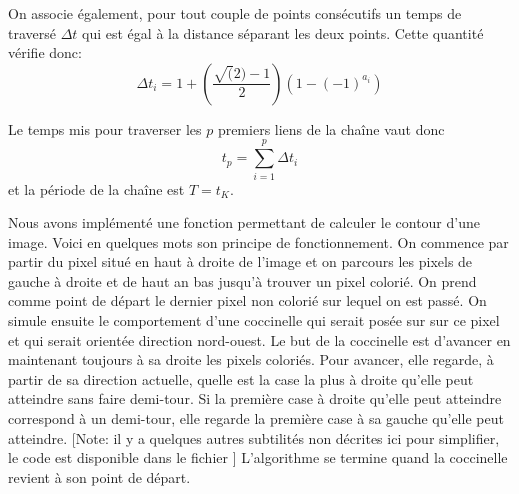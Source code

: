 On associe également, pour tout couple de points consécutifs 
un temps de traversé $\Delta t$ qui est égal à la distance 
séparant les deux points.
Cette quantité vérifie donc:
\[
\Delta t_i = 1 + \left( \frac{\sqrt(2) - 1}{2} \right) \left( 1 - (-1)^{a_i} \right)
\]

Le temps mis pour traverser les $p$ premiers liens de la chaîne vaut donc 
\[
t_p = \sum_{i = 1}^{p} \Delta t_i
\]
et la période de la chaîne est $T = t_K$.


Nous avons implémenté une fonction permettant de calculer le 
contour d'une image.
Voici en quelques mots son principe de fonctionnement. 
On commence par partir du pixel situé en haut à droite de l'image 
et on parcours les pixels de gauche à droite et de haut an bas 
jusqu'à trouver un pixel colorié. 
On prend comme point de départ le dernier pixel non colorié sur lequel 
on est passé.
On simule ensuite le comportement d'une coccinelle qui serait posée sur 
sur ce pixel et qui serait orientée direction nord-ouest. 
Le but de la coccinelle est d'avancer en maintenant toujours à sa 
droite les pixels coloriés. 
Pour avancer, elle regarde, à partir de sa direction actuelle, quelle 
est la case la plus à droite qu'elle peut atteindre sans faire demi-tour.
Si la première case à droite qu'elle peut atteindre correspond à un demi-tour, 
elle regarde la première case à sa gauche qu'elle peut atteindre.
[Note: il y a quelques autres subtilités non décrites ici pour simplifier, 
le code est disponible dans le fichier ]
L'algorithme se termine quand la coccinelle revient à son point de départ.

